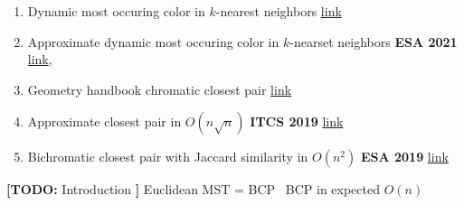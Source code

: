 \documentclass[a4paper,UKenglish,cleveref, autoref, thm-restate]{lipics-v2021}
\newcommand{\nota}[3]{{%
		\color{#2}
		\marginpar{\color{#2!75!black}\textbf\texttimes}%
		\textsf{\textbf{[\textbullet#1:}
			\textsf{\small#3}
			\textbf{\textbullet]}}%
}}
\newcommand{\todo}[1]{\nota{TODO}{red!55!black}{#1}}
\begin{document}
\begin{enumerate}
    \item Dynamic most occuring color in $k$-nearest neighbors 
    \href{https://arxiv.org/pdf/2205.00277.pdf}{link}
    
    \item Approximate dynamic most occuring color in $k$-nearset neighbors \textbf{ESA 2021} \href{https://drops.dagstuhl.de/opus/volltexte/2021/14625/pdf/LIPIcs-ESA-2021-44.pdf}{link},
    
    \item Geometry handbook chromatic closest pair \href{https://www.csun.edu/~ctoth/Handbook/chap43.pdf}{link}
    
    \item Approximate closest pair in $O(n \sqrt{n})$ \textbf{ITCS 2019}
    \href{https://cs.emis.de/LIPIcs/volltexte/2018/10110/pdf/LIPIcs-ITCS-2019-17_.pdf}{link}
    
    \item Bichromatic closest pair with Jaccard similarity in $O(n^2)$ \textbf{ESA 2019} \href{https://arxiv.org/pdf/1907.02251.pdf}{link}
\end{enumerate}

\todo{Introduction}
Euclidean MST = BCP~\cite{Pankaj1990}
BCP in expected $O(n)$~\cite{Khuller1991}
\end{document}

